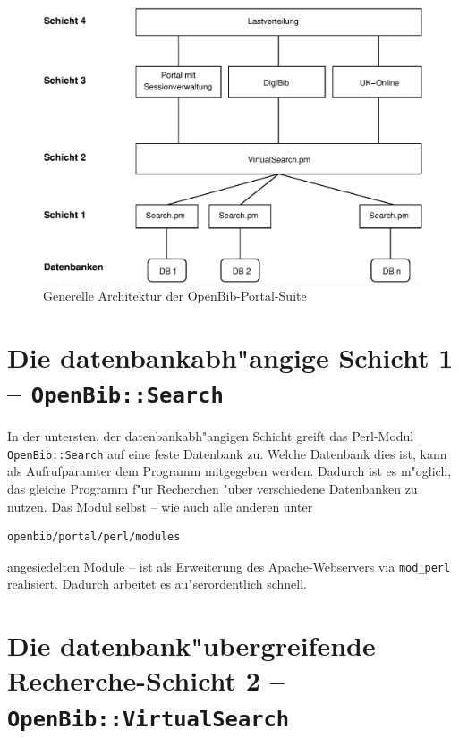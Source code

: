 \documentclass[11pt, twoside, a4paper, BCOR8mm, DIV12, bibtotoc,idxtotoc]{scrbook}
\begin{document}
\begin{figure}
\begin{shadowenv}
  \vspace{4mm}
    \centering \begin{minipage}[b]{1.0\textwidth}
      \centering \includegraphics[width=12cm]{schicht04.eps}
    \end{minipage}
    \caption{Generelle Architektur der OpenBib-Portal-Suite}
  \label{bild:architektur}
  \vspace{3mm}
\end{shadowenv}
\end{figure}

\section{Die datenbankabh"angige Schicht 1 -- \texttt{OpenBib::Search}}

In der untersten, der datenbankabh"angigen Schicht greift das
Perl-Modul \texttt{OpenBib::Search} auf eine feste Datenbank zu.
Welche Datenbank dies ist, kann als Aufrufparamter dem Programm
mitgegeben werden. Dadurch ist es m"oglich, das gleiche Programm f"ur
Recherchen "uber ver\-schie\-de\-ne Daten\-banken zu nutzen. Das Modul
selbst -- wie auch alle anderen unter
\begin{verbatim}
openbib/portal/perl/modules
\end{verbatim}
angesiedelten Module -- ist als Erweiterung des Apache-Webservers via
\texttt{mod\_perl} realisiert.  Dadurch arbeitet es au"ser\-ordentlich
schnell.


\section{Die datenbank"ubergreifende Recherche-Schicht 2 -- \texttt{OpenBib::VirtualSearch}}
\end{document}
